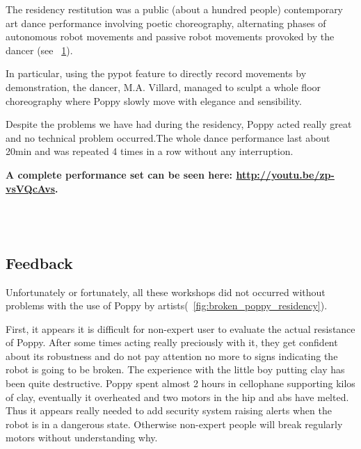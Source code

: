 The residency restitution was a public (about a hundred people) contemporary art dance performance involving poetic choreography, alternating phases of autonomous robot movements and passive robot movements provoked by the dancer (see \figurename~\ref{fig:poppy_dance_performance}).

In particular, using the pypot feature to directly record movements by demonstration, the dancer, M.A. Villard, managed to sculpt a whole floor choreography where Poppy slowly move with elegance and sensibility.

Despite the problems we have had during the residency, Poppy acted really great and no technical problem occurred.The whole dance performance last about 20min and was repeated 4 times in a row without any interruption.

\textbf{A complete performance set can be seen here: \url{http://youtu.be/zp-vsVQcAvs}.}

\begin{figure}[]
\centering
    \hfil
    \\
    \hfil
    \\
    \caption{}
    \label{fig:poppy_dance_performance}
\end{figure}




\subsection{Feedback} %


Unfortunately or fortunately, all these workshops did not occurred without problems with the use of Poppy by artists(\figurename~\ref{fig:broken_poppy_residency}).

First, it appears it is difficult for non-expert user to evaluate the actual resistance of Poppy. After some times acting really preciously with it, they get confident about its robustness and do not pay attention no more to signs indicating the robot is going to be broken. The experience with the little boy putting clay has been quite destructive. Poppy spent almost 2 hours in cellophane supporting kilos of clay, eventually it overheated and two motors in the hip and abs have melted.
Thus it appears really needed to add security system raising alerts when the robot is in a dangerous state.  Otherwise non-expert people will break regularly motors without understanding why.

